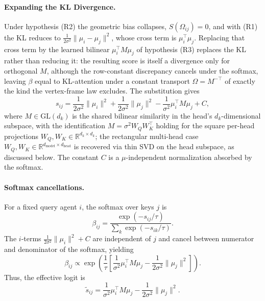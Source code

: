 \paragraph{Expanding the KL Divergence.}
Under hypothesis (R2) the geometric bias collapses, $S(\Omega_{ij}) = 0$, and with (R1) the KL reduces to $\frac{1}{2\sigma^2}\|\mu_i - \mu_j\|^2$, whose cross term is $\mu_i^\top\mu_j$. Replacing that cross term by the learned bilinear $\mu_i^\top M \mu_j$ of hypothesis (R3) replaces the KL rather than reducing it: the resulting score is itself a divergence only for orthogonal $M$, although the row-constant discrepancy cancels under the softmax, leaving $\beta$ equal to KL-attention under a constant transport $\Omega = M^{-\top}$ of exactly the kind the vertex-frame law excludes. The substitution gives
\begin{equation}
s_{ij} = \frac{1}{2\sigma^2}\|\mu_i\|^2 + \frac{1}{2\sigma^2}\|\mu_j\|^2 - \frac{1}{\sigma^2}\mu_i^\top M \mu_j + C,
\end{equation}
where $M \in \mathrm{GL}(d_k)$ is the shared bilinear similarity in the head's $d_k$-dimensional subspace, with the identification $M = \sigma^2 W_Q W_K^\top$ holding for the square per-head projections $W_Q, W_K \in \mathbb{R}^{d_k \times d_k}$; the rectangular multi-head case $W_Q, W_K \in \mathbb{R}^{d_{\text{model}}\times d_{\text{head}}}$ is recovered via thin SVD on the head subspace, as discussed below. The constant $C$ is a $\mu$-independent normalization absorbed by the softmax.

\paragraph{Softmax cancellations.}
For a fixed query agent $i$, the softmax over keys $j$ is
\begin{equation}
\beta_{ij} = \frac{\exp(-s_{ij}/\tau)}{\sum_k \exp(-s_{ik}/\tau)}.
\end{equation}
The $i$-terms $\frac{1}{2\sigma^2}\|\mu_i\|^2 + C$ are independent of $j$ and cancel between numerator and denominator of the softmax, yielding
\begin{equation}
\beta_{ij} \propto \exp\left(\frac{1}{\tau}\left[\frac{1}{\sigma^2}\mu_i^\top M \mu_j - \frac{1}{2\sigma^2}\|\mu_j\|^2\right]\right).
\end{equation}
Thus, the effective logit is
\begin{equation}
\tilde{s}_{ij} = \frac{1}{\sigma^2}\mu_i^\top M \mu_j - \frac{1}{2\sigma^2}\|\mu_j\|^2.
\end{equation}

